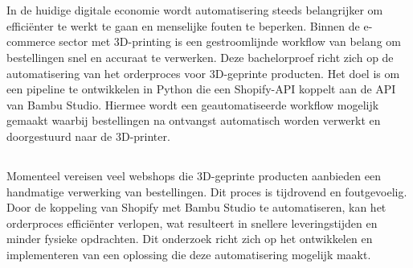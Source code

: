 
\chapter{}%
\label{ch:inleiding}

In de huidige digitale economie wordt automatisering steeds belangrijker om efficiënter te werkt te gaan en menselijke fouten te beperken. Binnen de e-commerce sector met 3D-printing is een gestroomlijnde workflow van belang om bestellingen snel en accuraat te verwerken. Deze bachelorproef richt zich op de automatisering van het orderproces voor 3D-geprinte producten. Het doel is om een pipeline te ontwikkelen in Python die een Shopify-API koppelt aan de API van Bambu Studio. Hiermee wordt een geautomatiseerde workflow mogelijk gemaakt waarbij bestellingen na ontvangst automatisch worden verwerkt en doorgestuurd naar de 3D-printer.



\section{}%
\label{sec:probleemstelling}

Momenteel vereisen veel webshops die 3D-geprinte producten aanbieden een handmatige verwerking van bestellingen. Dit proces is tijdrovend en foutgevoelig. Door de koppeling van Shopify met Bambu Studio te automatiseren, kan het orderproces efficiënter verlopen, wat resulteert in snellere leveringstijden en minder fysieke opdrachten. Dit onderzoek richt zich op het ontwikkelen en implementeren van een oplossing die deze automatisering mogelijk maakt.


